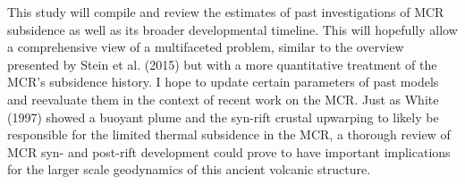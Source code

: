 \documentclass[11pt,a4paper]{article}
\begin{document}
This study will compile and review the estimates of past investigations of MCR subsidence as well as its broader developmental timeline. This will hopefully allow a comprehensive view of a multifaceted problem, similar to the overview presented by Stein et al. (2015) but with a more quantitative treatment of the MCR's subsidence history. I hope to update certain parameters of past models and reevaluate them in the context of recent work on the MCR. Just as White (1997) showed a buoyant plume and the syn-rift crustal upwarping to likely be responsible for the limited thermal subsidence in the MCR, a thorough review of MCR syn- and post-rift development could prove to have important implications for the larger scale geodynamics of this ancient volcanic structure.




\end{document}
